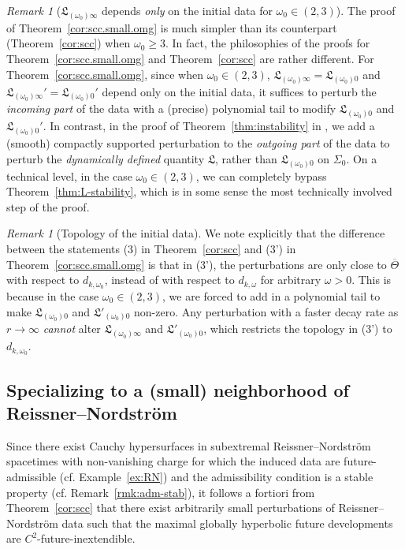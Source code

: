 \documentclass[10pt, reqno]{amsart}
\theoremstyle{definition}
\theoremstyle{remark}
\newtheorem{remark}[theorem]{Remark}
\numberwithin{equation}{section}
\newcommand{\0}{\emptyset}
\newcommand{\Sgm}{\Sigma}
\newcommand{\Tht}{\Theta}
\newcommand{\omg}{\omega}
\begin{document}
\begin{remark}[$\mathfrak L_{(\omg_0)\infty}$ depends \emph{only} on the initial data for $\omg_0\in (2,3)$]
The proof of Theorem~\ref{cor:scc.small.omg} is much simpler than its counterpart (Theorem~\ref{cor:scc}) when $\omg_0\geq 3$. In fact, the philosophies of the proofs for Theorem~\ref{cor:scc.small.omg} and Theorem~\ref{cor:scc} are rather different. For Theorem~\ref{cor:scc.small.omg}, since when $\omg_0 \in (2,3)$, $\mathfrak L_{(\omg_0)\infty}=\mathfrak L_{(\omg_0)0}$ and $\mathfrak L_{(\omg_0)\infty}'=\mathfrak L_{(\omg_0)0}'$ depend only on the initial data, it suffices to perturb the \emph{incoming part} of the data with a (precise) polynomial tail to modify $\mathfrak L_{(\omg_0)0}$ and $\mathfrak L_{(\omg_0)0}'$. In contrast, in the proof of Theorem~\ref{thm:instability} in \cite{LO.exterior}, we add a (smooth) compactly supported perturbation to the \emph{outgoing part} of the data to perturb the \emph{dynamically defined} quantity $\mathfrak{L}$, rather than $\mathfrak{L}_{(\omg_{0}) 0}$ on $\Sgm_{0}$. On a technical level, in the case $\omg_0\in (2,3)$, we can completely bypass Theorem~\ref{thm:L-stability}, which is in some sense the most technically involved step of the proof.
\end{remark}

\begin{remark}[Topology of the initial data]
We note explicitly that the difference between the statements (3) in Theorem~\ref{cor:scc} and (3') in Theorem~\ref{cor:scc.small.omg} is that in (3'), the perturbations are only close to $\overline{\Tht}$ with respect to $d_{k, \omg_{0}}$, instead of with respect to $d_{k,\omg}$ for arbitrary $\omg>0$. This is because in the case $\omg_0\in (2,3)$, we are forced to add in a polynomial tail to make $\mathfrak L_{(\omg_0)0}$ and $\mathfrak L'_{(\omg_0)0}$ non-zero. Any perturbation with a faster decay rate as $r \to \infty$ \emph{cannot} alter $\mathfrak{L}_{(\omg_{0}) \infty}$ and $\mathfrak L'_{(\omg_0)0}$, which restricts the topology in (3') to $d_{k, \omg_{0}}$.
\end{remark}

\subsection{Specializing to a (small) neighborhood of Reissner--Nordstr\"om}\label{sec.instab.RN}
Since there exist Cauchy hypersurfaces in subextremal Reissner--Nordstr\"om spacetimes with non-vanishing charge for which the induced data are future-admissible (cf. Example~\ref{ex:RN}) and the admissibility condition is a stable property (cf. Remark~\ref{rmk:adm-stab}), it follows a fortiori from Theorem~\ref{cor:scc} that there exist arbitrarily small perturbations of Reissner--Nordstr\"om data such that the maximal globally hyperbolic future developments are $C^2$-future-inextendible. 
\end{document}

